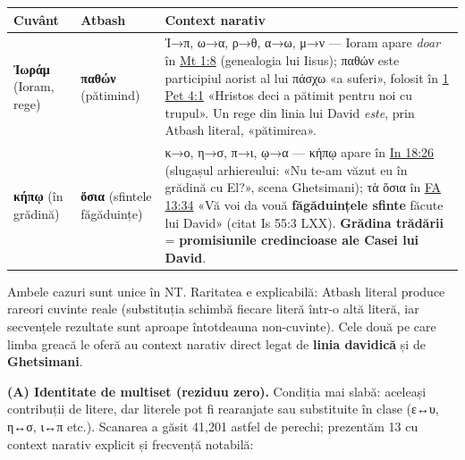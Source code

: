 \documentclass[12pt,a4paper,twoside,openany]{book}
\begin{document}
\begin{center}
\footnotesize
\begin{tabular}{L{2.6cm}L{2.6cm}L{8.3cm}}
\toprule
{}
\textbf{Cuvânt} & \textbf{Atbash} & \textbf{Context narativ} \\
\midrule
\textbf{Ἰωράμ} (Ioram, rege) & \textbf{παθών} (pătimind) & Ἰ→π, ω→α, ρ→θ, α→ω, μ→ν --- Ioram apare \textit{doar} în \href{https://bibliaortodoxa.ro/carte.php?id=55\&cap=1\#8}{Mt 1:8} (genealogia lui Iisus); παθών este participiul aorist al lui πάσχω «a suferi», folosit în \href{https://bibliaortodoxa.ro/carte.php?id=67\&cap=4\#1}{1 Pet 4:1} «Hristos deci a pătimit pentru noi cu trupul». Un rege din linia lui David \textit{este}, prin Atbash literal, «pătimirea». \\
\textbf{κήπῳ} (în grădină) & \textbf{ὅσια} (sfintele făgăduințe) & κ→ο, η→σ, π→ι, ῳ→α --- κήπῳ apare în \href{https://bibliaortodoxa.ro/carte.php?id=35\&cap=18\#26}{In 18:26} (slugașul arhiereului: «Nu te-am văzut eu în grădină cu El?», scena Ghetsimani); τὰ ὅσια în \href{https://bibliaortodoxa.ro/carte.php?id=51\&cap=13\#34}{FA 13:34} «Vă voi da vouă \textbf{făgăduințele sfinte} făcute lui David» (citat Is 55:3 LXX). \textbf{Grădina trădării} = \textbf{promisiunile credincioase ale Casei lui David}. \\
\bottomrule
\end{tabular}
\end{center}

Ambele cazuri sunt unice în NT. Raritatea e explicabilă: Atbash literal produce rareori cuvinte reale (substituția schimbă fiecare literă într-o altă literă, iar secvențele rezultate sunt aproape întotdeauna non-cuvinte). Cele două pe care limba greacă le oferă au context narativ direct legat de \textbf{linia davidică} și de \textbf{Ghetsimani}.

\textbf{(A) Identitate de multiset (reziduu zero).} Condiția mai slabă: aceleași contribuții de litere, dar literele pot fi rearanjate sau substituite în clase (ε↔υ, η↔σ, ι↔π etc.). Scanarea a găsit 41{,}201 astfel de perechi; prezentăm 13 cu context narativ explicit și frecvență notabilă:
\end{document}
